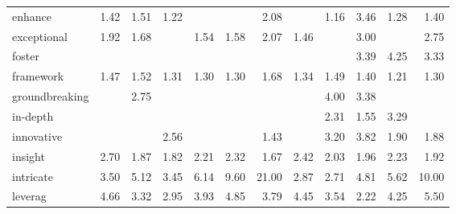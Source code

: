 \begin{tabular}{lrrrrrrrrrrr}
enhance & \cellcolor{blue!28} 1.42 & \cellcolor{blue!30} 1.51 & \cellcolor{blue!24} 1.22 &  &  & \cellcolor{blue!41} 2.08 &  & \cellcolor{blue!23} 1.16 & \cellcolor{blue!69} 3.46 & \cellcolor{blue!25} 1.28 & \cellcolor{blue!27} 1.40 \\
exceptional & \cellcolor{blue!38} 1.92 & \cellcolor{blue!33} 1.68 &  & \cellcolor{blue!30} 1.54 & \cellcolor{blue!31} 1.58 & \cellcolor{blue!41} 2.07 & \cellcolor{blue!29} 1.46 &  & \cellcolor{blue!60} 3.00 &  & \cellcolor{blue!55} 2.75 \\
foster &  &  &  &  &  &  &  &  & \cellcolor{blue!67} 3.39 & \cellcolor{blue!85} 4.25 & \cellcolor{blue!66} 3.33 \\
framework & \cellcolor{blue!29} 1.47 & \cellcolor{blue!30} 1.52 & \cellcolor{blue!26} 1.31 & \cellcolor{blue!26} 1.30 & \cellcolor{blue!26} 1.30 & \cellcolor{blue!33} 1.68 & \cellcolor{blue!26} 1.34 & \cellcolor{blue!29} 1.49 & \cellcolor{blue!27} 1.40 & \cellcolor{blue!24} 1.21 & \cellcolor{blue!26} 1.30 \\
groundbreaking &  & \cellcolor{blue!55} 2.75 &  &  &  &  &  & \cellcolor{blue!80} 4.00 & \cellcolor{blue!67} 3.38 &  &  \\
in-depth &  &  &  &  &  &  &  & \cellcolor{blue!46} 2.31 & \cellcolor{blue!31} 1.55 & \cellcolor{blue!65} 3.29 &  \\
innovative &  &  & \cellcolor{blue!51} 2.56 &  &  & \cellcolor{blue!28} 1.43 &  & \cellcolor{blue!64} 3.20 & \cellcolor{blue!76} 3.82 & \cellcolor{blue!38} 1.90 & \cellcolor{blue!37} 1.88 \\
insight & \cellcolor{blue!54} 2.70 & \cellcolor{blue!37} 1.87 & \cellcolor{blue!36} 1.82 & \cellcolor{blue!44} 2.21 & \cellcolor{blue!46} 2.32 & \cellcolor{blue!33} 1.67 & \cellcolor{blue!48} 2.42 & \cellcolor{blue!40} 2.03 & \cellcolor{blue!39} 1.96 & \cellcolor{blue!44} 2.23 & \cellcolor{blue!38} 1.92 \\
intricate & \cellcolor{blue!70} 3.50 & \cellcolor{blue!100} 5.12 & \cellcolor{blue!69} 3.45 & \cellcolor{blue!100} 6.14 & \cellcolor{blue!100} 9.60 & \cellcolor{blue!100} 21.00 & \cellcolor{blue!57} 2.87 & \cellcolor{blue!54} 2.71 & \cellcolor{blue!96} 4.81 & \cellcolor{blue!100} 5.62 & \cellcolor{blue!100} 10.00 \\
leverag & \cellcolor{blue!93} 4.66 & \cellcolor{blue!66} 3.32 & \cellcolor{blue!59} 2.95 & \cellcolor{blue!78} 3.93 & \cellcolor{blue!97} 4.85 & \cellcolor{blue!75} 3.79 & \cellcolor{blue!89} 4.45 & \cellcolor{blue!70} 3.54 & \cellcolor{blue!44} 2.22 & \cellcolor{blue!85} 4.25 & \cellcolor{blue!100} 5.50 \\

\end{tabular}
